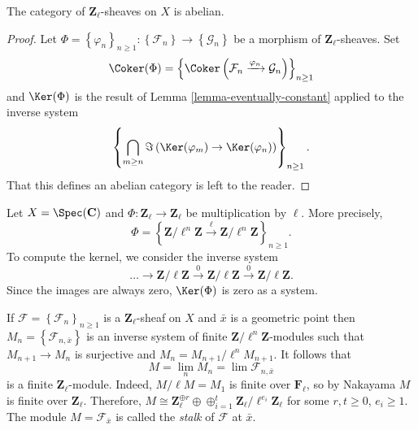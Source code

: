 \begin{lemma}
\label{lemma-l-adic-abelian}
The category of $\mathbf{Z}_\ell$-sheaves on $X$ is abelian.
\end{lemma}

\begin{proof}
Let
$\Phi = \left\{\varphi_n\right\}_{n\geq 1} :
\left\{\mathcal{F}_n\right\}
\to
\left\{\mathcal{G}_n\right\}$
be a morphism of $\mathbf{Z}_\ell$-sheaves. Set
$$
\Coker(\Phi) =
\left\{
\Coker\left(\mathcal{F}_n \xrightarrow{\varphi_n} \mathcal{G}_n\right)
\right\}_{n\geq 1}
$$
and $\Ker(\Phi)$ is the result of
Lemma \ref{lemma-eventually-constant}
applied to the inverse system
$$
\left\{
\bigcap_{m\geq n}
\Im\left(\Ker(\varphi_m) \to \Ker(\varphi_n)\right)
\right\}_{n \geq 1}.
$$
That this defines an abelian category is left to the reader.
\end{proof}

\begin{example}
\label{example-kernel}
Let $X=\Spec(\mathbf{C})$ and $\Phi : \mathbf{Z}_\ell\to \mathbf{Z}_\ell$
be multiplication by $\ell$. More precisely,
$$
\Phi = \left\{ \mathbf{Z}/\ell^n\mathbf{Z} \xrightarrow{\ell}
\mathbf{Z}/\ell^n\mathbf{Z}\right\}_{n \geq 1}.
$$
To compute the kernel, we consider the inverse system
$$
\ldots\to \mathbf{Z}/\ell\mathbf{Z}\xrightarrow{0}
\mathbf{Z}/\ell\mathbf{Z}\xrightarrow{0}\mathbf{Z}/\ell\mathbf{Z}.
$$
Since the images are always zero, $\Ker(\Phi)$ is zero as a system.
\end{example}

\begin{remark}
\label{remark-stalk-l-adic-sheaf}
If $\mathcal{F} = \left\{\mathcal{F}_n\right\}_{n\geq 1}$ is a
$\mathbf{Z}_\ell$-sheaf on $X$ and $\bar x$ is a geometric point then
$M_n = \left\{\mathcal{F}_{n, \bar x}\right\}$ is an inverse system of finite
$\mathbf{Z}/\ell^n\mathbf{Z}$-modules such that $M_{n+1}\to M_n$ is surjective
and $M_n = M_{n+1}/\ell^n M_{n+1}$. It follows that
$$
M = \lim_n M_n = \lim \mathcal{F}_{n, \bar x}
$$
is a finite $\mathbf{Z}_\ell$-module. Indeed, $M/\ell M= M_1$ is finite over
$\mathbf{F}_\ell$, so by Nakayama $M$ is finite over $\mathbf{Z}_\ell$.
Therefore, $M\cong \mathbf{Z}_\ell^{\oplus r} \oplus \oplus_{i = 1}^t
\mathbf{Z}_\ell/\ell^{e_i}\mathbf{Z}_\ell$ for some $r, t\geq 0$, $e_i\geq 1$.
The module $M = \mathcal{F}_{\bar x}$ is called the {\it stalk} of
$\mathcal{F}$ at $\bar x$.
\end{remark}


